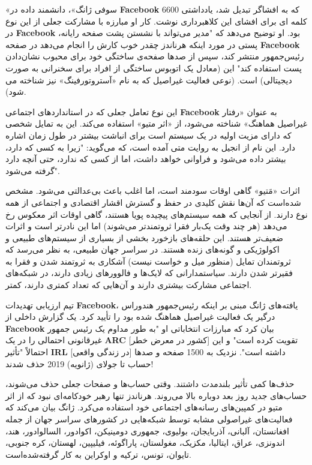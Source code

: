 «سوفی ژانگ»، دانشمند داده در \textenglish{\textbf{Facebook}} که به افشاگر تبدیل شد، یادداشتی 6600 کلمه ای برای افشای این کلاهبرداری نوشت.
کار او مبارزه با مشارکت جعلی از این نوع در \textenglish{\textbf{Facebook}} بود.
او توضیح می‌دهد که "مدیر می‌تواند با نشستن پشت صفحه رایانه، پستی در مورد اینکه هرناندز چقدر خوب کارش را انجام می‌دهد در صفحه \textenglish{\textbf{Facebook}} رئیس‌جمهور منتشر کند، سپس از صدها صفحه‌ی ساختگی خود برای محبوب نشان‌دادن پست استفاده کند" این (معادل یک اتوبوس ساختگی از افراد برای سخنرانی به صورت دیجیتالی) است.
(نوعی فعالیت غیراصیل که به نام «آستروتورفینگ» نیز شناخته می شود).

این نوع تعامل جعلی که در استانداردهای اجتماعی \textenglish{\textbf{Facebook}} به عنوان «رفتار غیراصیل هماهنگ» شناخته می‌شود، از «اثر متیو» استفاده می‌کند.
این به تمایل شخصی که دارای مزیت اولیه در یک سیستم است برای انباشت بیشتر در طول زمان اشاره دارد.
این نام از انجیل به روایت متی آمده است، که می‌گوید: "زیرا به کسی که دارد، بیشتر داده می‌شود و فراوانی خواهد داشت، اما از کسی که ندارد، حتی آنچه دارد گرفته می‌شود".

اثرات «مَتیو» گاهی اوقات سودمند است، اما اغلب باعث بی‌عدالتی می‌شود.
مشخص شده‌است که آن‌ها نقش کلیدی در حفظ و گسترش اقشار اقتصادی و اجتماعی از همه نوع دارند.
از آنجایی که همه سیستم‌های پیچیده پویا هستند، گاهی اوقات اثر معکوس رخ می‌دهد (هر چند وقت یک‌بار فقرا ثروتمندتر می‌شوند) اما این نادرتر است و اثرات ضعیف‌تر هستند.
این حلقه‌های بازخورد بخشی از بسیاری از سیستم‌های طبیعی و اکولوژیکی و گونه‌های زنده هستند.
در سراسر جهان طبیعی، به نظر می‌رسد که ثروتمندان تمایل (منظور میل و خواست نیست) آشکاری به ثروتمند شدن و فقرا به فقیرتر شدن دارند.
سیاستمدارانی که لایک‌ها و فالوورهای زیادی دارند، در شبکه‌های اجتماعی مشارکت بیشتری دارند و آن‌هایی که تعداد کمتری دارند، کمتر.

تیم ارزیابی تهدیدات \textenglish{\textbf{Facebook}}، یافته‌های ژانگ مبنی بر اینکه رئیس‌جمهور هندوراس درگیر یک فعالیت غیراصیل هماهنگ شده بود را تأیید کرد.
یک گزارش داخلی از \textenglish{\textbf{Facebook}} بیان کرد که مبارزات انتخاباتی او "به طور مداوم یک رئیس جمهور غیرقانونی احتمالی را در یک \textenglish{\textbf{ARC}} [کشور در معرض خطر] تقویت کرده است" و این احتمالاً "تأثیر \textenglish{\textbf{IRL}} [در زندگی واقعی] داشته است".
نزدیک به 1500 صفحه و صدها حساب تا جولای (ژانویه) 2019 حذف شدند!

حذف‌ها کمی تأثیر بلندمدت داشتند.
وقتی حساب‌ها و صفحات جعلی حذف می‌شوند، حساب‌های جدید روز بعد دوباره بالا می‌روند.
هرناندز تنها رهبر خودکامه‌ای نبود که از اثر متیو در کمپین‌های رسانه‌های اجتماعی خود استفاده می‌کرد.
ژانگ بیان می‌کند که فعالیت‌های غیراصولی مشابه توسط شبکه‌هایی در کشورهای سراسر جهان از جمله افغانستان، آلبانی، آذربایجان، بولیوی، جمهوری دومینیکن، اکوادور، السالوادور، هند، اندونزی، عراق، ایتالیا، مکزیک، مغولستان، پاراگوئه، فیلیپین، لهستان، کره جنوبی، تایوان، تونس، ترکیه و اوکراین به کار گرفته‌شده‌است.

